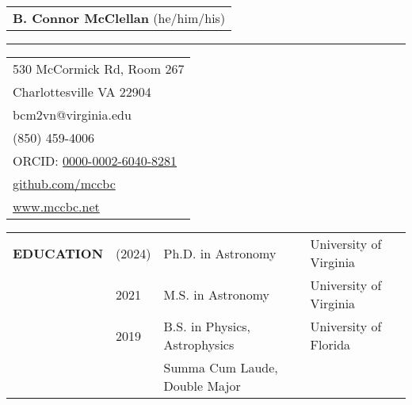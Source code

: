 \documentclass{article}
\begin{document}
\thispagestyle{empty}

\begin{tabular}{l}
    \large\textbf{B. Connor McClellan} \small(he/him/his)\\
\end{tabular}
\vspace{-0.25cm}
\begin{center}
\rule{0.92\textwidth}{.4pt}    
\end{center}
\vspace{0.1cm}
 
\begin{tabular}{l}
    530 McCormick Rd, Room 267 \\
    Charlottesville VA 22904 \\
    bcm2vn@virginia.edu \\
    (850) 459-4006 \\
     ORCID: \href{https://orcid.org/0000-0002-6040-8281}{0000-0002-6040-8281} \\
     \href{https://github.com/mccbc}{github.com/mccbc} \\
     \href{www.mccbc.net}{www.mccbc.net} \\ 
\end{tabular}

\vspace{0.5cm}
\begin{tabular}{p{4cm}p{2.2cm}ll}
    \large{\textbf{EDUCATION}} & (2024) & Ph.D. in Astronomy & University of Virginia \\
                    & 2021 & M.S. in Astronomy & University of Virginia \\
                    & 2019 & B.S. in Physics, Astrophysics &  University of Florida \\
        & & \small Summa Cum Laude, Double Major &  \vspace{0.125cm} \\
\end{tabular}
\end{document}
